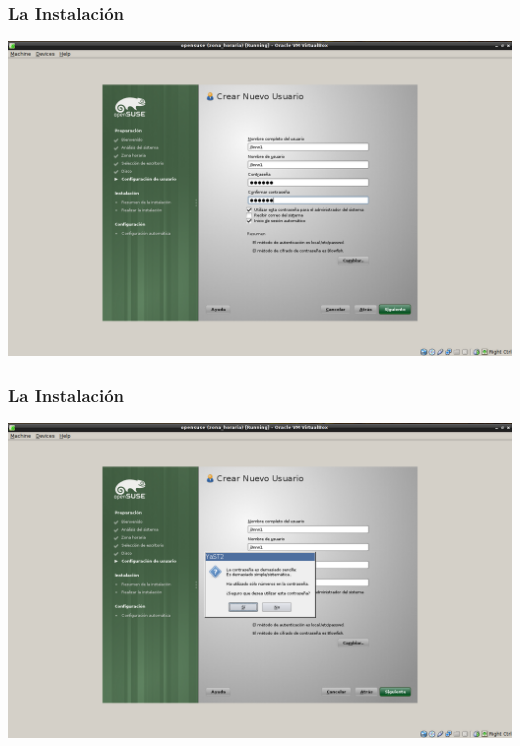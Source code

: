 \documentclass{beamer}
\begin{document}
\begin{frame}
\frametitle{La Instalaci\'on}
\includegraphics[height=0.8\textheight]{12_.png} \hspace*{7.3cm}
\end{frame} 
\begin{frame}
\frametitle{La Instalaci\'on}
\includegraphics[height=0.8\textheight]{13.png} \hspace*{7.3cm}
\end{frame} 
\end{document}
